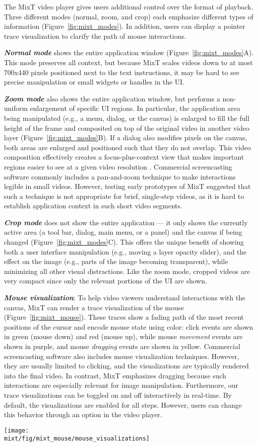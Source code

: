 The MixT video player gives users additional control over the format of playback. Three different modes (normal, zoom, and crop) each emphasize different types of information (Figure~\ref{fig:mixt_modes}). In addition, users can display a pointer trace visualization to clarify the path of mouse interactions.

\emph{\textbf{Normal mode}} shows the entire application window (Figure~\ref{fig:mixt_modes}A). This mode preserves all context, but because MixT scales videos down to at most 700x440 pixels positioned next to the text instructions, it may be hard to see precise manipulation or small widgets or handles in the UI.

\emph{\textbf{Zoom mode}} also shows the entire application window, but performs a non-uniform enlargement of specific UI regions. In particular, the application area being manipulated (e.g., a menu, dialog, or the canvas) is enlarged to fill the full height of the frame and composited on top of the original video in another video layer (Figure~\ref{fig:mixt_modes}B). If a dialog also modifies pixels on the canvas, both areas are enlarged and positioned such that they do not overlap. This video composition effectively creates a focus-plus-context view that makes important regions easier to see at a given video resolution \cite{Furnas:1986:GFV:22627.22342}. Commercial screencasting software commonly includes a pan-and-zoom technique to make interactions legible in small videos. However, testing early prototypes of MixT suggested that such a technique is not appropriate for brief, single-step videos, as it is hard to establish application context in such short video segments.

\emph{\textbf{Crop mode}} does not show the entire application — it only shows the currently active area (a tool bar, dialog, main menu, or a panel) and the canvas if being changed (Figure~\ref{fig:mixt_modes}C). This offers the unique benefit of showing both a user interface manipulation (e.g., moving a layer opacity slider), and the effect on the image (e.g., parts of the image becoming transparent), while minimizing all other visual distractions. Like the zoom mode, cropped videos are very compact since only the relevant portions of the UI are shown.

\emph{\textbf{Mouse visualization}}: To help video viewers understand interactions with the canvas, MixT can render a trace visualization of the mouse (Figure~\ref{fig:mixt_mouse}). These traces show a fading path of the most recent positions of the cursor and encode mouse state using color: click events are shown in green (mouse down) and red (mouse up), while mouse \emph{movement} events are shown in purple, and mouse \emph{dragging} events are shown in yellow. Commercial screencasting software also includes mouse visualization techniques. However, they are usually limited to clicking, and the visualizations are typically rendered into the final video. In contrast, MixT emphasizes dragging because such interactions are especially relevant for image manipulation. Furthermore, our trace visualizations can be toggled on and off interactively in real-time. By default, the visualizations are enabled for all steps. However, users can change this behavior through an option in the video player.

\begin{figure*}[t!]
  \centering
  \texttt{[image: \\mixt/fig/mixt\_mouse/mouse\_visualizations]}
  \caption{Mouse visualization distinguishes moving and dragging.}
  \label{fig:mixt_mouse}
\end{figure*}
